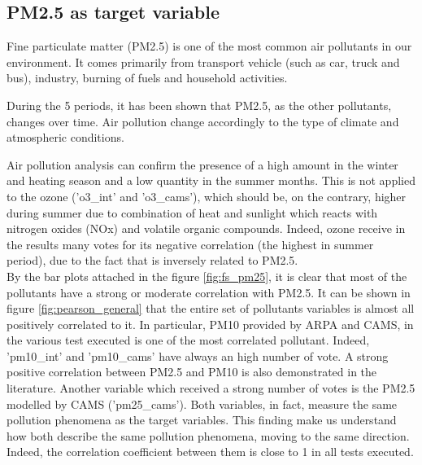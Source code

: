 \subsection{PM2.5 as target variable}
Fine particulate matter (PM2.5) is one of the most common air pollutants in our environment. 
It comes primarily from transport vehicle (such as car, truck and bus), industry, burning of fuels and household activities.\\ \par
During the 5 periods, it has been shown that PM2.5, as the other pollutants, changes over time. Air pollution change accordingly to the type of climate and atmospheric conditions.\\

Air pollution analysis can confirm the presence of a high amount in the winter and heating season and a low quantity in the summer months\cite{cichowicz2017dispersion}. This is not applied to the ozone ('o3\_int' and 'o3\_cams'), which should be, on the contrary, higher during summer due to combination of heat and sunlight which reacts with nitrogen oxides (NOx) and volatile organic compounds. Indeed, ozone receive in the results many votes for its negative correlation (the highest in summer period), due to the fact that is inversely related to PM2.5.\\
By the bar plots attached in the figure \ref{fig:fs_pm25}, it is clear that most of the pollutants have a strong or moderate correlation with PM2.5. 
It can be shown in figure \ref{fig:pearson_general} that the entire set of pollutants variables is almost all positively correlated to it.
In particular, PM10 provided by ARPA and CAMS, in the various test executed is one of the most correlated pollutant. Indeed, 'pm10\_int' and 'pm10\_cams' have always an high number of vote. A strong positive correlation between PM2.5 and PM10 is also demonstrated in the literature\cite{zhou2016concentrations}.
Another variable which received a strong number of votes is the PM2.5 modelled by CAMS ('pm25\_cams'). 
Both variables, in fact, measure the same pollution phenomena as the target variables. This finding make us understand how both describe the same pollution phenomena, moving to the same direction. Indeed, the correlation coefficient between them is close to 1 in all tests executed.
